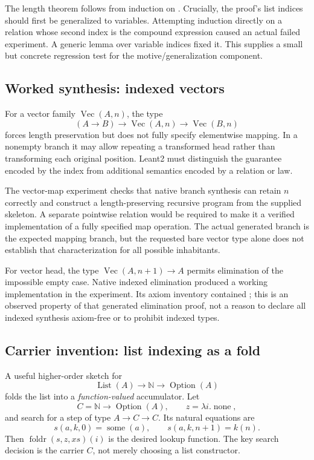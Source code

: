 The length theorem follows from induction on . Crucially, the proof's list indices should first be generalized to variables. Attempting induction directly on a relation whose second index is the compound expression  caused an actual failed experiment. A generic lemma over variable indices fixed it. This supplies a small but concrete regression test for the motive/generalization component.

\subsection{Worked synthesis: indexed vectors}

For a vector family $\operatorname{Vec}(A,n)$, the type
\[
 (A\to B)\to\operatorname{Vec}(A,n)\to\operatorname{Vec}(B,n)
\]
forces length preservation but does not fully specify elementwise mapping. In a nonempty branch it may allow repeating a transformed head rather than transforming each original position. Leant2 must distinguish the guarantee encoded by the index from additional semantics encoded by a relation or law.

The vector-map experiment checks that native branch synthesis can retain $n$ correctly and construct a length-preserving recursive program from the supplied skeleton. A separate pointwise relation would be required to make it a verified implementation of a fully specified map operation. The actual generated branch is the expected mapping branch, but the requested bare vector type alone does not establish that characterization for all possible inhabitants.

For vector head, the type $\operatorname{Vec}(A,n+1)\to A$ permits elimination of the impossible empty case. Native indexed elimination produced a working implementation in the experiment. Its axiom inventory contained ; this is an observed property of that generated elimination proof, not a reason to declare all indexed synthesis axiom-free or to prohibit indexed types.

\subsection{Carrier invention: list indexing as a fold}

A useful higher-order sketch for
\[
 \operatorname{List}(A)\to\mathbb N\to\operatorname{Option}(A)
\]
folds the list into a \emph{function-valued} accumulator. Let
\[
 C=\mathbb N\to\operatorname{Option}(A),\qquad z=\lambda i.\operatorname{none},
\]
and search for a step of type $A\to C\to C$. Its natural equations are
\[
 s(a,k,0)=\operatorname{some}(a),\qquad s(a,k,n+1)=k(n).
\]
Then $\operatorname{foldr}(s,z,xs)(i)$ is the desired lookup function. The key search decision is the carrier $C$, not merely choosing a list constructor.

